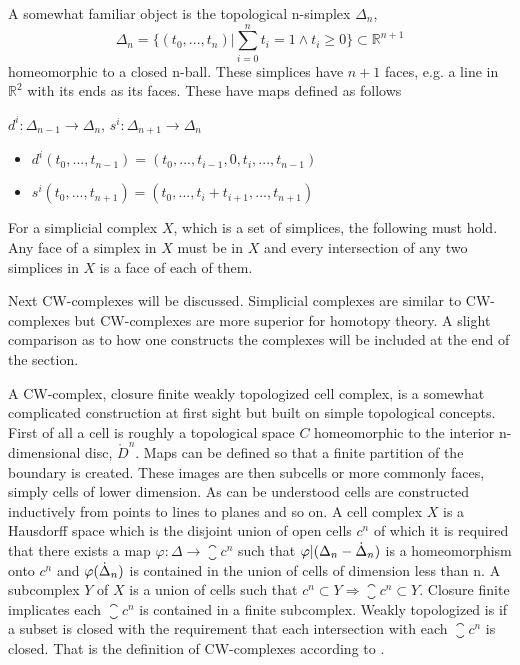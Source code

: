 \documentclass[../../main.tex]{subfiles}
\begin{document}
    A somewhat familiar object is the topological n-simplex $\Delta_n$,
    \begin{equation}
        \Delta_n = \{(t_0, . . . , t_n)  |\sum_{i=0}^{n}t_i=1 \wedge t_i \geq 0\} \subset \mathbb{R}^{n+1}
    \end{equation}
    homeomorphic to a closed n-ball. These simplices have $n+1$ faces, e.g. a line in $\mathbb{R}^2$ with its ends as its faces. These have maps defined as follows
    
    \begin{definition}\label{simp-map}
        $d^i:\Delta_{n-1}\to \Delta_n$, $s^i:\Delta_{n+1}\to \Delta_n$
        \begin{itemize}
           \item $d^i(t_0,...,t_{n-1})=(t_0,...,t_{i-1},0,t_i,...,t_{n-1})$
           \item $s^i(t_0,...,t_{n+1})=(t_0,...,t_i+t_{i+1},...,t_{n+1})$
        \end{itemize}
    \end{definition}
    
    For a simplicial complex $X$, which is a set of simplices, the following must hold. Any face of a simplex in $X$ must be in $X$ and every intersection of any two simplices in $X$ is a face of each of them.
    
    Next CW-complexes will be discussed. Simplicial complexes are similar to CW-complexes but CW-complexes are more superior for homotopy theory. A slight comparison as to how one constructs the complexes will be included at the end of the section. 
    
    A CW-complex, closure finite weakly topologized cell complex, is a somewhat complicated construction at first sight but built on simple topological concepts. First of all a cell is roughly a topological space $C$ homeomorphic to the interior n-dimensional disc, $\mathring{D}^n$. Maps can be defined so that a finite partition of the boundary is created. These images are then subcells or more commonly faces, simply cells of lower dimension. As can be understood cells are constructed inductively from points to lines to planes and so on. A cell complex $X$ is a Hausdorff space which is the disjoint union of open cells $c^n$ of which it is required that there exists a map $\varphi:\Delta\to\closure{c}^n$ such that $\varphi|(\Delta_n - \dot{\Delta}_n )$ is a homeomorphism onto $c^n$ and $\varphi(\dot{\Delta}_n)$ is contained in the union of cells of dimension less than n. A subcomplex $Y$ of $X$ is a union of cells such that $c^n\subset Y \Rightarrow \closure{c}^n\subset Y$. Closure finite implicates each $\closure{c}^n$ is contained in a finite subcomplex. Weakly topologized is if a subset is closed with the requirement that each intersection with each $\closure{c}^n$ is closed. That is the definition of CW-complexes according to \cite{simp-maye}.
    
\end{document}
